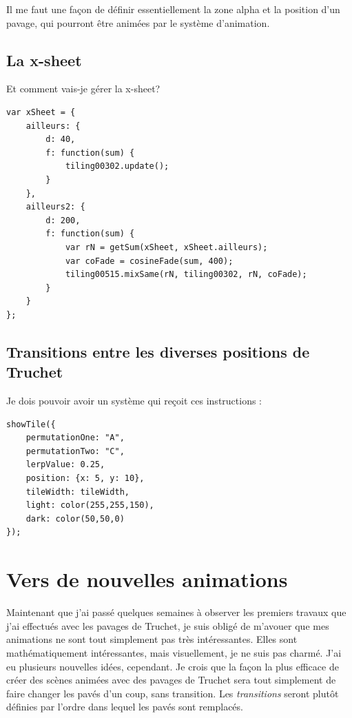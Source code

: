 Il me faut une façon de définir essentiellement la zone alpha et la position d'un pavage, qui pourront être animées par le système d'animation.

\newpage
\subsection{La x-sheet}

Et comment vais-je gérer la x-sheet?

\begin{lstlisting}
var xSheet = {
    ailleurs: {
        d: 40,
        f: function(sum) {
            tiling00302.update();
        }
    },
    ailleurs2: {
        d: 200,
        f: function(sum) {
            var rN = getSum(xSheet, xSheet.ailleurs);
            var coFade = cosineFade(sum, 400);
            tiling00515.mixSame(rN, tiling00302, rN, coFade);
        }
    }
};
\end{lstlisting}

\subsection{Transitions entre les diverses positions de Truchet}

Je dois pouvoir avoir un système qui reçoit ces instructions :

\begin{lstlisting}
showTile({
    permutationOne: "A",
    permutationTwo: "C",
    lerpValue: 0.25,
    position: {x: 5, y: 10},
    tileWidth: tileWidth,
    light: color(255,255,150),
    dark: color(50,50,0)
});
\end{lstlisting}

\newpage
\section{Vers de nouvelles animations}
Maintenant que j'ai passé quelques semaines à observer les premiers travaux que j'ai effectués avec les pavages de Truchet, je suis obligé de m'avouer que mes animations ne sont tout simplement pas très intéressantes. Elles sont mathématiquement intéressantes, mais visuellement, je ne suis pas charmé. J'ai eu plusieurs nouvelles idées, cependant. Je crois que la façon la plus efficace de créer des scènes animées avec des pavages de Truchet sera tout simplement de faire changer les pavés d'un coup, sans transition. Les \textit{transitions} seront plutôt définies par l'ordre dans lequel les pavés sont remplacés.

